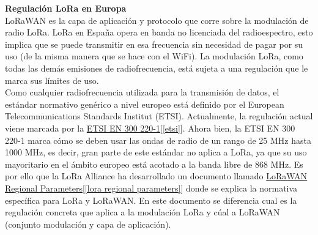 \documentclass[12pt]{article}
\begin{document}
	 
	
	\noindent  \textbf{Regulación LoRa en Europa} \\
	
	\noindent LoRaWAN es la capa de aplicación y protocolo que corre sobre la modulación de radio LoRa. LoRa en España opera en banda no licenciada del radioespectro, esto implica que se puede transmitir en esa frecuencia sin necesidad de pagar por su uso (de la misma manera que se hace con el WiFi). La modulación LoRa, como todas las demás emisiones de radiofrecuencia, está sujeta a una regulación que le marca sus límites de uso. \\
	
	\noindent Como cualquier radiofrecuencia utilizada para la transmisión de datos, el estándar normativo genérico a nivel europeo está definido por el European Telecommunications Standards Institut (ETSI). Actualmente, la regulación actual viene marcada por la \href{https://www.etsi.org/deliver/etsi_en/300200_300299/30022001/03.01.01_60/en_30022001v030101p.pdf}{ETSI EN 300 220-1}[\ref{etsi}]. Ahora bien, la ETSI EN 300 220-1 marca cómo se deben usar las ondas de radio de un rango de 25 MHz hasta 1000 MHz, es decir, gran parte de este estándar no aplica a LoRa, ya que su uso mayoritario en el ámbito europeo está acotado a la banda libre de 868 MHz. Es por ello que la LoRa Alliance ha desarrollado un documento llamado \href{https://lora-alliance.org/resource_hub/rp2-1-0-3-lorawan-regional-parameters/}{LoRaWAN Regional Parameters}[\ref{lora regional parameters}] donde se explica la normativa específica para LoRa y LoRaWAN. En este documento se diferencia cual es la regulación concreta que aplica a la modulación LoRa y cúal a LoRaWAN (conjunto modulación y capa de aplicación).\\
	
\end{document}
